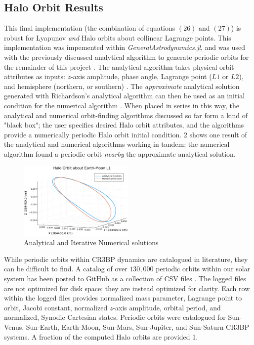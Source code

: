 \documentclass[conf]{new-aiaa}
\begin{document}
\begin{multicols}{2}
\subsection{Halo Orbit Results}
This final implementation (the combination of equations $(26)$ and $(27)$) 
is robust for Lyapunov \textit{and} Halo orbits about collinear Lagrange points. 
This implementation was impemented within \textit{GeneralAstrodynamics.jl}, and 
was used with the previously discussed analytical algorithm to generate 
periodic orbits for the remainder of this project \cite{carpinelli2020astro}.
The analytical algorithm takes physical orbit attributes as inputs: $z$-axis 
amplitude, phase angle, Lagrange point ($L1$ or $L2$), and hemisphere 
(northern, or southern) \cite{rund2018interplanetary}. 
The \textit{approximate} analytical solution generated 
with Richardson's analytical algorithm can then be used as an initial 
condition for the numerical algorithm \cite{rund2018interplanetary} 
\cite{richardson1980analytical}. When placed in series in this way, the 
analytical and numerical orbit-finding algorithms discussed so far form a 
kind of "black box"; the user specifies desired Halo orbit attributes, 
and the algorithms provide a numerically periodic Halo orbit initial condition.
\figurename{2} shows one result of the analytical and numerical algorithms 
working in tandem; the numerical algorithm found a periodic orbit \textit{nearby}
the approximate analytical solution. 

\begin{figure}[H]
    \hskip -0.3cm
    \includegraphics[width=0.5\textwidth]{analytical_numerical_halo.png}
    \caption{Analytical and Iterative Numerical solutions}
\end{figure}

While periodic orbits within CR3BP dynamics are catalogued in literature,
they can be difficult to find. A catalog of over $130,000$ periodic orbits 
within our solar system has been posted to GitHub as a collection of CSV files 
\cite{carpinelli2020halos}. The logged files are not optimized for disk 
space; they are instead optimized for clarity. Each row within the logged files 
provides normalized mass parameter, Lagrange point to orbit, Jacobi constant,
normalized $z$-axis amplitude, orbital period, and  
normalized, Synodic Cartesian states. Periodic orbits were catalogued for 
Sun-Venus, Sun-Earth, Earth-Moon, Sun-Mars, Sun-Jupiter, and Sun-Saturn CR3BP 
systems. A fraction of the computed Halo orbits are provided \tablename{1}.


\end{multicols}
\end{document}
